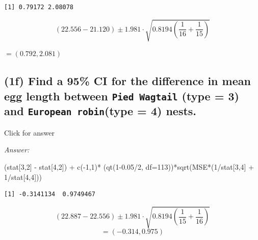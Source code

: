 \documentclass[
]{book}
\newenvironment{Shaded}{\begin{snugshade}}{\end{snugshade}}
\newcommand{\AttributeTok}[1]{\textcolor[rgb]{0.77,0.63,0.00}{#1}}
\newcommand{\DecValTok}[1]{\textcolor[rgb]{0.00,0.00,0.81}{#1}}
\newcommand{\FloatTok}[1]{\textcolor[rgb]{0.00,0.00,0.81}{#1}}
\newcommand{\FunctionTok}[1]{\textcolor[rgb]{0.00,0.00,0.00}{#1}}
\newcommand{\NormalTok}[1]{#1}
\newcommand{\SpecialCharTok}[1]{\textcolor[rgb]{0.00,0.00,0.00}{#1}}
\begin{document}
\begin{verbatim}
[1] 0.79172 2.08078
\end{verbatim}

\[(22.556 - 21.120) \pm 1.981 \cdot \sqrt{0.8194\left(\frac{1}{16} + \frac{1}{15} \right)}\]

\(=(0.792, 2.081)\)

\hypertarget{f-find-a-95-ci-for-the-difference-in-mean-egg-length-between-pied-wagtail-type-3-and-european-robintype-4-nests.}{%
\subsection{\texorpdfstring{(1f) Find a 95\% CI for the difference in mean egg length between \texttt{Pied\ Wagtail} (type = 3) and \texttt{European\ robin}(type = 4) nests.}{(1f) Find a 95\% CI for the difference in mean egg length between Pied Wagtail (type = 3) and European robin(type = 4) nests.}}\label{f-find-a-95-ci-for-the-difference-in-mean-egg-length-between-pied-wagtail-type-3-and-european-robintype-4-nests.}}

Click for answer

\emph{Answer:}

\begin{Shaded}
\begin{Highlighting}[]
\NormalTok{(stat[}\DecValTok{3}\NormalTok{,}\DecValTok{2}\NormalTok{] }\SpecialCharTok{{-}}\NormalTok{ stat[}\DecValTok{4}\NormalTok{,}\DecValTok{2}\NormalTok{]) }\SpecialCharTok{+} \FunctionTok{c}\NormalTok{(}\SpecialCharTok{{-}}\DecValTok{1}\NormalTok{,}\DecValTok{1}\NormalTok{)}\SpecialCharTok{*}\NormalTok{ (}\FunctionTok{qt}\NormalTok{(}\DecValTok{1}\FloatTok{{-}0.05}\SpecialCharTok{/}\DecValTok{2}\NormalTok{, }\AttributeTok{df=}\DecValTok{113}\NormalTok{))}\SpecialCharTok{*}\FunctionTok{sqrt}\NormalTok{(MSE}\SpecialCharTok{*}\NormalTok{(}\DecValTok{1}\SpecialCharTok{/}\NormalTok{stat[}\DecValTok{3}\NormalTok{,}\DecValTok{4}\NormalTok{] }\SpecialCharTok{+} \DecValTok{1}\SpecialCharTok{/}\NormalTok{stat[}\DecValTok{4}\NormalTok{,}\DecValTok{4}\NormalTok{]))}
\end{Highlighting}
\end{Shaded}

\begin{verbatim}
[1] -0.3141134  0.9749467
\end{verbatim}

\[(22.887 - 22.556) \pm 1.981\cdot \sqrt{0.8194\left(\frac{1}{15} + \frac{1}{16} \right)}\]
\[ = (-0.314, 0.975)\]
\end{document}
